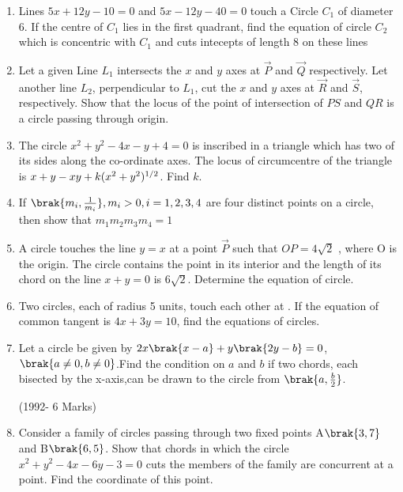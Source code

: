 \begin{enumerate}
\hfill {}
\item Lines $5x+12y-10=0$ and $5x-12y-40=0$ touch a Circle $C_1$ of diameter 6. If the centre of $C_1$ lies in the first quadrant, find the equation of circle $C_2$ which is concentric with $C_1$ and cuts intecepts of length 8 on these lines

\hfill {}
\item Let a given Line $L_1$ intersects the $x$ and $y$ axes at $\vec{P}$ and $\vec{Q}$ respectively. Let another line $L_2$, perpendicular to $L_1$, cut the $x$ and $y$ axes at $\vec{R}$ and $\vec{S}$, respectively. Show that the locus of the point of intersection of $PS$ and $QR$ is a circle passing through origin.

\hfill {}
\item The circle $x^2+y^2-4x-y+4=0$ is inscribed in a triangle which has two of its sides along the co-ordinate axes. The locus of circumcentre of the triangle is $x+y-xy+k(x^2+y^2)\textsuperscript{1/2}$. Find $k$.

\hfill {}
\item If $\brak{ m_i, \frac{1}{m_i}}, m_i > 0, i = 1, 2, 3, 4$ are four distinct points on a circle, then show that $m_1m_2m_3m_4=1$

\hfill {}
\item A circle touches the line $y=x$ at a point $\vec{P}$ such that $OP=4\sqrt{2}$ , where O is the origin. The circle contains the point  in its interior and the length of its chord on the line $x+y=0$ is $6\sqrt{2}$. Determine the equation of circle.

\hfill {}
\item Two circles, each of radius 5 units, touch each other at . If the equation of common tangent is $4x+3y=10$, find the equations of circles.

\hfill {}
	\item Let a circle be given by $2x\brak{x-a}+y\brak{2y-b}=0$,$\brak{a\neq0,b\neq0}$.Find the condition on $a$ and $b$ if two chords, each bisected by the x-axis,can be drawn to the circle from $\brak{a,\frac{b}{2}}$.                         

\hfill(1992- 6 Marks)\\




\item Consider a family of circles passing through two fixed points A$\brak{3,7}$ and B$\brak{6,5}$. Show that chords in which the circle $x^2+y^2-4x-6y-3=0$ cuts the members of the family are concurrent at a point. Find the coordinate of this point.
	        

\end{enumerate}
